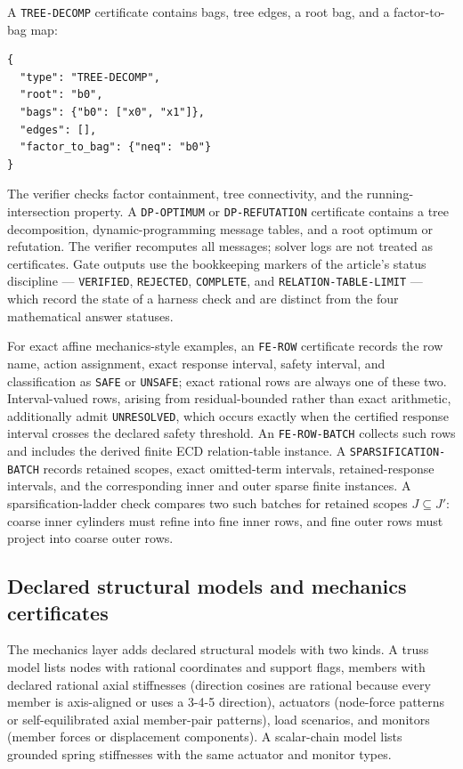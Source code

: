A \texttt{TREE-DECOMP} certificate contains bags, tree edges, a root bag, and a
factor-to-bag map:
\begin{verbatim}
{
  "type": "TREE-DECOMP",
  "root": "b0",
  "bags": {"b0": ["x0", "x1"]},
  "edges": [],
  "factor_to_bag": {"neq": "b0"}
}
\end{verbatim}
The verifier checks factor containment, tree connectivity, and the
running-intersection property. A \texttt{DP-OPTIMUM} or \texttt{DP-REFUTATION}
certificate contains a tree decomposition, dynamic-programming message tables,
and a root optimum or refutation. The verifier recomputes all messages; solver
logs are not treated as certificates. Gate outputs use the bookkeeping markers
of the article's status discipline --- \texttt{VERIFIED}, \texttt{REJECTED},
\texttt{COMPLETE}, and \texttt{RELATION-TABLE-LIMIT} --- which record the
state of a harness check and are distinct from the four mathematical answer
statuses.

For exact affine mechanics-style examples, an \texttt{FE-ROW} certificate records
the row name, action assignment, exact response interval, safety interval, and
classification as \texttt{SAFE} or \texttt{UNSAFE}; exact rational rows are
always one of these two. Interval-valued rows, arising from residual-bounded
rather than exact arithmetic, additionally admit \texttt{UNRESOLVED}, which
occurs exactly when the certified response interval crosses the declared safety
threshold. An \texttt{FE-ROW-BATCH}
collects such rows and includes the derived finite ECD relation-table instance.
A \texttt{SPARSIFICATION-BATCH} records retained scopes, exact omitted-term
intervals, retained-response intervals, and the corresponding inner and outer
sparse finite instances. A sparsification-ladder check compares two such batches
for retained scopes $J\subseteq J'$: coarse inner cylinders must refine into fine
inner rows, and fine outer rows must project into coarse outer rows.

\subsection{Declared structural models and mechanics certificates}

The mechanics layer adds declared structural models with two kinds. A truss
model lists nodes with rational coordinates and support flags, members with
declared rational axial stiffnesses (direction cosines are rational because
every member is axis-aligned or uses a 3-4-5 direction), actuators (node-force
patterns or self-equilibrated axial member-pair patterns), load scenarios, and
monitors (member forces or displacement components). A scalar-chain model lists
grounded spring stiffnesses with the same actuator and monitor types.

